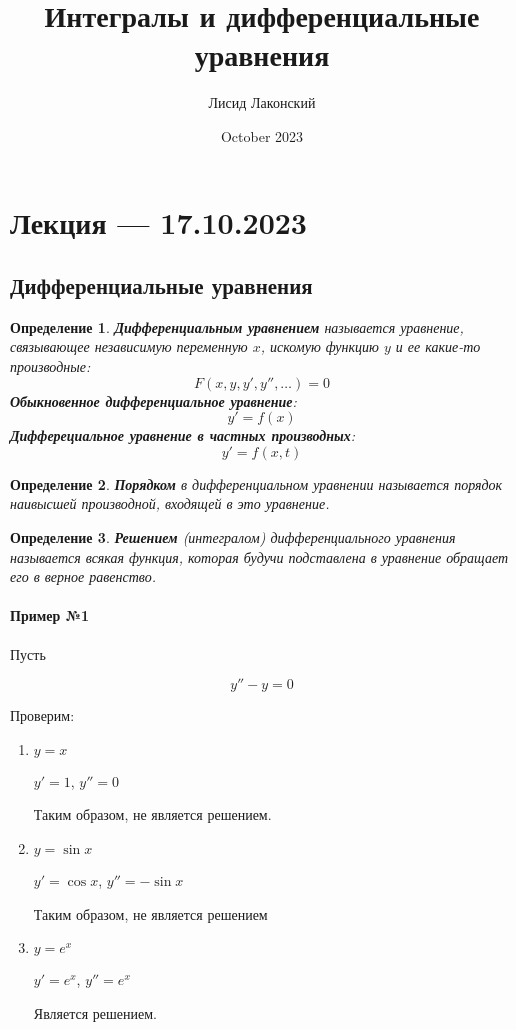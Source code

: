 \documentclass{article}
\title{Интегралы и дифференциальные уравнения}
\author{Лисид Лаконский}
\date{October 2023}
\newtheorem{definition}{Определение}
\begin{document}
\raggedright

\maketitle

\tableofcontents
\pagebreak

\section{Лекция — 17.10.2023}

\subsection{Дифференциальные уравнения}

\begin{definition}
    \textbf{Дифференциальным уравнением} называется уравнение, связывающее независимую переменную $x$, искомую функцию $y$ и ее какие-то производные:
    $$
    F(x, y, y', y'', \dots) = 0
    $$
    \textbf{Обыкновенное дифференциальное уравнение}:
    $$
    y' = f(x)
    $$
    \textbf{Дифферециальное уравнение в частных производных}:
    $$
    y' = f(x, t)
    $$
\end{definition}

\begin{definition}
    \textbf{Порядком} в дифференциальном уравнении называется порядок наивысшей производной, входящей в это уравнение.
\end{definition}

\begin{definition}
    \textbf{Решением} (интегралом) дифференциального уравнения называется всякая функция, которая будучи подставлена в уравнение обращает его в верное равенство.
\end{definition}

\paragraph{Пример №1}

Пусть

$$y'' - y = 0$$

Проверим:

\begin{enumerate}
    \item $y = x$

    $y' = 1$, $y'' = 0$

    Таким образом, не является решением.
    \item $y = \sin x$

    $y' = \cos x$, $y'' = -\sin x$

    Таким образом, не является решением
    \item $y = e^{x}$

    $y' = e^{x}$, $y'' = e^{x}$

    Является решением.
\end{enumerate}
\end{document}
